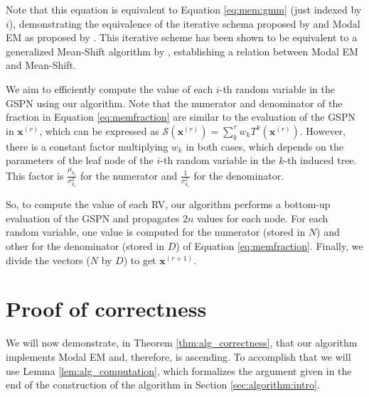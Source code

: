 \noindent Note that this equation is equivalent to Equation \ref{eq:mem:gmm} (just indexed by $i$), demonstrating the equivalence of the iterative schema proposed by \citet{Carreira-Perpinan2000} and Modal EM as proposed by \citet{Li2007}. This iterative scheme has been shown to be equivalent to a generalized Mean-Shift algorithm by \citet{Chacon2019}, establishing a relation between Modal EM and Mean-Shift.

We aim to efficiently compute the value of each $i$-th random variable in the GSPN using our algorithm. Note that the numerator and denominator of the fraction in Equation \ref{eq:memfraction} are similar to the evaluation of the GSPN in $\mathbf{x}^{(r)}$, which can be expressed as $\mathcal{S}(\mathbf{x}^{(r)}) = \sum_k^\tau w_k T^k(\mathbf{x}^{(r)})$. However, there is a constant factor multiplying $w_k$ in both cases, which depends on the parameters of the leaf node of the $i$-th random variable in the $k$-th induced tree. This factor is $\frac{\mu_{k_i}}{\sigma^2_{k_i}}$ for the numerator and $\frac{1}{\sigma^2_{k_i}}$ for the denominator.

So, to compute the value of each RV, our algorithm performs a bottom-up evaluation of the GSPN and propagates $2n$ values for each node. For each random variable, one value is computed for the numerator (stored in $N$) and other for the denominator (stored in $D$) of Equation \ref{eq:memfraction}. Finally, we divide the vectors ($N$ by $D$) to get $\mathbf{x}^{(r+1)}$.

\section{Proof of correctness}
\label{sec:algorithm:proof}

We will now demonstrate, in Theorem \ref{thm:alg_correctness}, that our algorithm implements Modal EM and, therefore, is ascending. To accomplish that we will use Lemma \ref{lem:alg_computation}, which formalizes the argument given in the end of the construction of the algorithm in Section \ref{sec:algorithm:intro}.

